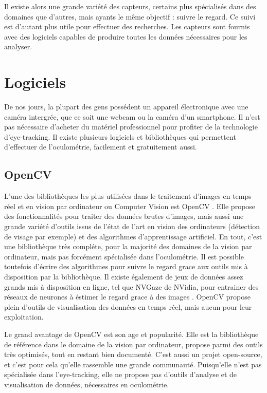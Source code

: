 \documentclass[12pt]{article}
\begin{document}
\bigskip
Il existe alors une grande variété des capteurs, certains plus spécialisés dans
des domaines que d'autres, mais ayants le même objectif : suivre le regard. Ce
suivi est d'autant plus utile pour effectuer des recherches. Les capteurs sont
fournis avec des logiciels capables de produire toutes les données nécessaires
pour les analyser.


\section{Logiciels}

De nos jours, la plupart des gens possédent un appareil électronique avec une
caméra intergrée, que ce soit une webcam ou la caméra d'un smartphone. Il n'est
pas nécessaire d'acheter du matériel professionnel pour profiter de la
technologie d'eye-tracking. Il existe plusieurs logiciels et bibliothèques qui
permettent d'effectuer de l'oculométrie, facilement et gratuitement aussi.

\subsection{OpenCV}

L'une des bibliothèques les plus utilisées dans le traitement d'images en temps
réel et en vision par ordinateur ou Computer Vision est OpenCV \cite{opencv}.
Elle propose des fonctionnalités pour traiter des données brutes d'images, mais
aussi une grande variété d'outils issus de l'état de l'art en vision des
ordinateurs (détection de visage par exemple) et des algorithmes d'apprentissage
artificiel. En tout, c'est une bibliothèque très compléte, pour la majorité des
domaines de la vision par ordinateur, mais pas forcément spécialisée dans
l'oculométrie. Il est possible toutefois d'écrire des algorithmes pour suivre
le regard grace aux outils mis à disposition par la bibliothèque. Il existe
également de jeux de données assez grands mis à disposition en ligne, tel que
NVGaze \cite{nvgaze} de NVidia, pour entrainer des réseaux de neurones à
éstimer le regard grace à des images \cite{gaze_tracking}. OpenCV propose plein
d'outils de visualisation des données en temps réel, mais aucun pour leur
exploitation.

\bigskip
Le grand avantage de OpenCV est son age et popularité. Elle est la bibliothèque
de référence dans le domaine de la vision par ordinateur, propose parmi des
outils très optimisés, tout en restant bien documenté. C'est aussi un projet
open-source, et c'est pour cela qu'elle rassemble une grande communauté.
Puisqu'elle n'est pas spécialisée dans l'eye-tracking, elle ne propose pas
d'outils d'analyse et de visualisation de données, nécessaires en oculométrie.
\end{document}
